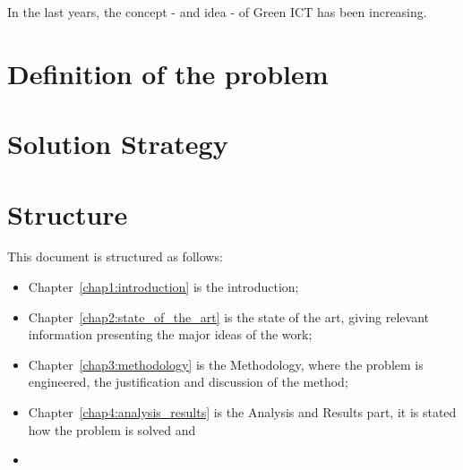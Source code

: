     
    In the last years, the concept - and idea - of Green ICT has been increasing. 
    


\section{Definition of the problem} \label{sec1:problem}

\section{Solution Strategy} \label{sec1:solution_strategy}

\section{Structure} \label{sec1:structure}
    This document is structured as follows:
    \begin{itemize}
    	\item Chapter~\ref{chap1:introduction} is the introduction;
    	\item Chapter~\ref{chap2:state_of_the_art} is the state of the art, giving relevant information presenting the major ideas of the work;
    	\item Chapter~\ref{chap3:methodology} is the Methodology, where the problem is engineered, the justification and discussion of the method;
    	\item Chapter~\ref{chap4:analysis_results} is the Analysis and Results part, it is stated how the problem is solved and 
    	\item 
    \end{itemize}
